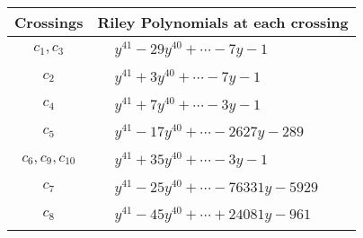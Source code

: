 \documentclass[1p]{elsarticle_modified}
\theoremstyle{definition}
\begin{document}
\begin{tabular}{m{50pt}|m{274pt}}
Crossings & \hspace{64pt}Riley Polynomials at each crossing \\
\hline $$\begin{aligned}c_{1},c_{3}\end{aligned}$$&$\begin{aligned}
&y^{41}-29 y^{40}+\cdots-7 y-1
\end{aligned}$\\
\hline $$\begin{aligned}c_{2}\end{aligned}$$&$\begin{aligned}
&y^{41}+3 y^{40}+\cdots-7 y-1
\end{aligned}$\\
\hline $$\begin{aligned}c_{4}\end{aligned}$$&$\begin{aligned}
&y^{41}+7 y^{40}+\cdots-3 y-1
\end{aligned}$\\
\hline $$\begin{aligned}c_{5}\end{aligned}$$&$\begin{aligned}
&y^{41}-17 y^{40}+\cdots-2627 y-289
\end{aligned}$\\
\hline $$\begin{aligned}c_{6},c_{9},c_{10}\end{aligned}$$&$\begin{aligned}
&y^{41}+35 y^{40}+\cdots-3 y-1
\end{aligned}$\\
\hline $$\begin{aligned}c_{7}\end{aligned}$$&$\begin{aligned}
&y^{41}-25 y^{40}+\cdots-76331 y-5929
\end{aligned}$\\
\hline $$\begin{aligned}c_{8}\end{aligned}$$&$\begin{aligned}
&y^{41}-45 y^{40}+\cdots+24081 y-961
\end{aligned}$\\
\hline
\end{tabular}
\vskip 2pc
\end{document}
